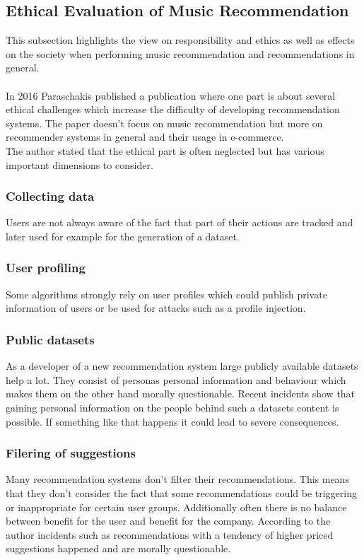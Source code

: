 \documentclass[runningheads,a4paper]{llncs}
\begin{document}
\subsection{Ethical Evaluation of Music Recommendation}
This subsection highlights the view on responsibility and ethics as well as effects on the society when performing music recommendation and recommendations in general. \\
\\
In 2016 Paraschakis published a publication where one part is about several ethical challenges 
which increase the difficulty of developing recommendation systems. The paper doesn't focus on music recommendation but more on recommender systems in general and their usage in e-commerce.\\
The author stated that the ethical part is often neglected but has various important dimensions to consider.
\subsubsection{Collecting data}
Users are not always aware of the fact that part of their actions are tracked and later used for example for the generation of a dataset.
\subsubsection{User profiling} 
Some algorithms strongly rely on user profiles which could publish private information of users or be used for attacks such as a profile injection.
\subsubsection{Public datasets}
As a developer of a new recommendation system large publicly available datasets help a lot.
They consist of personas personal information and behaviour which makes them on the other hand morally questionable.
Recent incidents show that gaining personal information on the people behind such a datasets content is possible. If something like that happens it could lead to severe consequences.
\subsubsection{Filering of suggestions}
Many recommendation systems don't filter their recommendations.
This means that they don't consider the fact that some recommendations could be triggering or inappropriate for certain user groups.
Additionally often there is no balance between benefit for the user and benefit for the company. According to the author incidents such as recommendations with a tendency of higher priced suggestions happened and are morally questionable.
\end{document}
